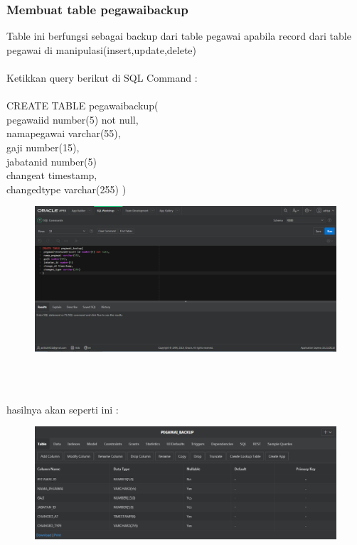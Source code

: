\documentclass[12pt, times new roman, a4paper]{report}
\begin{document}
\subsubsection{Membuat table pegawai\textunderscore backup}
\hspace{1cm} Table ini berfungsi sebagai backup dari table pegawai apabila record dari table pegawai di manipulasi(insert,update,delete)\\
\\
Ketikkan query berikut di SQL Command :\\
\\
CREATE TABLE pegawai\textunderscore backup(\\
 pegawai\textunderscore id number(5) not null,\\
 nama\textunderscore pegawai varchar(55),\\
 gaji number(15),\\
 jabatan\textunderscore id number(5)\\
 change\textunderscore at timestamp,\\
 changed\textunderscore type varchar(255)
)\\
\begin{figure}[h]
	\centering
		\includegraphics[scale=0.3]{gambar/6}
\end{figure}
\\
\\
\par hasilnya akan seperti ini :
\begin{figure}[h]
	\centering
		\includegraphics[scale=0.5]{gambar/7}
\end{figure}
\end{document}
